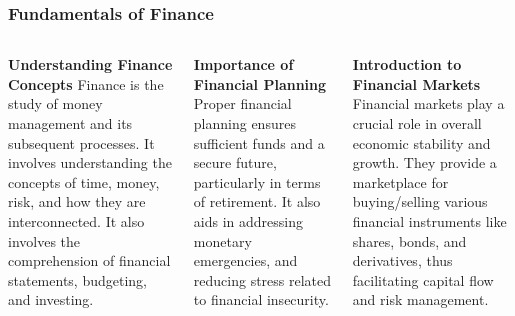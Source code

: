 \documentclass[5pt]{beamer}
\begin{document}
\begin{frame}
\frametitle{Fundamentals of Finance}
\begin{columns}
\begin{column}{0.3\textwidth}
\begin{block}{\textbf{Understanding Finance Concepts}}
Finance is the study of money management and its subsequent processes. It involves understanding the concepts of time, money, risk, and how they are interconnected. It also involves the comprehension of financial statements, budgeting, and investing.
\end{block}
\end{column}
\begin{column}{0.3\textwidth}
\begin{block}{\textbf{Importance of Financial Planning}}
Proper financial planning ensures sufficient funds and a secure future, particularly in terms of retirement. It also aids in addressing monetary emergencies, and reducing stress related to financial insecurity.
\end{block}
\end{column}
\begin{column}{0.3\textwidth}
\begin{block}{\textbf{Introduction to Financial Markets}}
Financial markets play a crucial role in overall economic stability and growth. They provide a marketplace for buying/selling various financial instruments like shares, bonds, and derivatives, thus facilitating capital flow and risk management.
\end{block}
\end{column}
\end{columns}
\end{frame}
\end{document}
